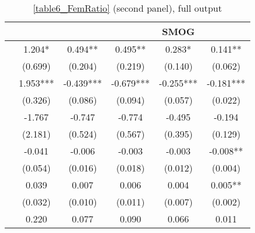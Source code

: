 \begin{table}
    \footnotesize
    \centering
    \begin{threeparttable}
        \caption{\autoref{table6_FemRatio} (second panel), full output}
        \label{table6_change_full}
        \begin{tabular}{p{3cm}S@{}S@{}S@{}S@{}S@{}}
            \toprule
            &{}&{}&{}&{SMOG}&{}\\
            \midrule
                  &       1.204*  &       0.494** &       0.495** &       0.283*  &       0.141** \\
                                          &     (0.699)   &     (0.204)   &     (0.219)   &     (0.140)   &     (0.062)   \\
                  &       1.953***&      -0.439***&      -0.679***&      -0.255***&      -0.181***\\
                                          &     (0.326)   &     (0.086)   &     (0.094)   &     (0.057)   &     (0.022)   \\
            &      -1.767   &      -0.747   &      -0.774   &      -0.495   &      -0.194   \\
                                          &     (2.181)   &     (0.524)   &     (0.567)   &     (0.395)   &     (0.129)   \\
                    &      -0.041   &      -0.006   &      -0.003   &      -0.003   &      -0.008** \\
                                          &     (0.054)   &     (0.016)   &     (0.018)   &     (0.012)   &     (0.004)   \\
                    &       0.039   &       0.007   &       0.006   &       0.004   &       0.005** \\
                                          &     (0.032)   &     (0.010)   &     (0.011)   &     (0.007)   &     (0.002)   \\
                       &       0.220   &       0.077   &       0.090   &       0.066   &       0.011   \\

\end{tabular}
\end{threeparttable}
\end{table}
